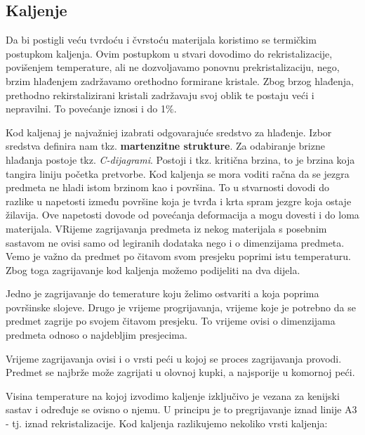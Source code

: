 \documentclass[a4paper,12pt]{article}
\numberwithin{figure}{section}
\begin{document}
\subsection{Kaljenje}
Da bi postigli veću tvrdoću i čvrstoću materijala koristimo se termičkim postupkom kaljenja. Ovim postupkom u stvari dovodimo do rekristalizacije, povišenjem temperature, ali ne dozvoljavamo ponovnu prekristalizaciju, nego, brzim hlađenjem zadržavamo orethodno formirane kristale. Zbog brzog hlađenja, prethodno rekirstalizirani kristali zadržavaju svoj oblik te postaju veći i nepravilni. To povećanje iznosi i do 1$\%$. \par
Kod kaljenaj je najvažniej izabrati odgovarajuće sredstvo za hlađenje. Izbor sredstva definira nam tkz. \textbf{martenzitne strukture}. Za odabiranje brizne hlađanja postoje tkz. \textit{C-dijagrami}.
Postoji i tkz. kritična brzina, to je brzina koja tangira liniju početka pretvorbe. Kod kaljenja se mora voditi račna da se jezgra predmeta ne hladi istom brzinom kao i površina. To u stvarnosti dovodi do razlike u napetosti između površine koja je tvrđa i krta spram jezgre koja ostaje žilavija. Ove napetosti dovode od povećanja deformacija a mogu dovesti i do loma materijala. VRijeme zagrijavanja predmeta iz nekog materijala s posebnim sastavom ne ovisi samo od legiranih dodataka nego i o dimenzijama predmeta. Vemo je važno da predmet po čitavom svom presjeku poprimi istu temperaturu. Zbog toga zagrijavanje kod kaljenja možemo podijeliti na dva dijela.\par
Jedno je zagrijavanje do temerature koju želimo ostvariti a koja poprima površinske slojeve. Drugo je vrijeme progrijavanja, vrijeme koje je potrebno da se predmet zagrije po svojem čitavom presjeku. To vrijeme ovisi o dimenzijama predmeta odnoso o najdebljim presjecima.\par 
Vrijeme zagrijavanja ovisi i o vrsti peći u kojoj se proces zagrijavanja provodi. Predmet se najbrže može zagrijati u olovnoj kupki, a najsporije u komornoj peći.\par
Visina temperature na kojoj izvodimo kaljenje izključivo je vezana za kenijski sastav i određuje se ovisno o njemu. U principu je to pregrijavanje iznad linije A3 - tj. iznad rekristalizacije. Kod kaljenja razlikujemo nekoliko vrsti kaljenja:
\end{document}
